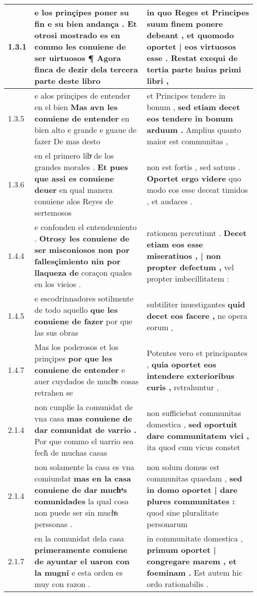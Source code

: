 \begin{tabular}{|p{1cm}|p{6.5cm}|p{6.5cm}|}
1.3.1 & e los prinçipes poner su fin e su bien andança . \textbf{ Et otrosi mostrado es en commo les conuiene de ser uirtuosos } ¶ Agora finca de dezir dela tercera parte deste libro & in quo Reges et Principes suum finem ponere debeant , \textbf{ et quomodo oportet | eos virtuosos esse . } Restat exequi de tertia parte huius primi libri , \\\hline
1.3.5 & e alos prinçipes de entender en el bien \textbf{ Mas avn les conuiene de entender } en bien alto e grande e guaue de fazer De mas desto & et Principes tendere in bonum , \textbf{ sed etiam decet eos tendere in bonum arduum . } Amplius quanto maior est communitas , \\\hline
1.3.6 & en el primero libͤ de los grandes morales . \textbf{ Et pues que assi es conuiene deuer } en qual manera conuiene alos Reyes de sertemosos & non est fortis , sed satuus . \textbf{ Oportet ergo videre } quo modo eos esse deceat timidos , et audaces . \\\hline
1.4.4 & e confonden el entendemiento . \textbf{ Otrosy les conuiene de ser misconiosos non por fallesçimiento nin por llaqueza de } coraçon quales en los vieios . & rationem percutiunt . \textbf{ Decet etiam eos esse miseratiuos , | non propter defectum , } vel propter imbecillitatem : \\\hline
1.4.5 & e escodrinnadores sotilmente de todo aquello \textbf{ que les conuiene de fazer } por que las sus obras & subtiliter inuestigantes \textbf{ quid decet eos facere , } ne opera eorum , \\\hline
1.4.7 & Mas los poderosos et los prinçipes \textbf{ por que les conuiene de entender } e auer cuydados de muchͣs cosas retrahen se & Potentes vero et principantes , \textbf{ quia oportet eos intendere exterioribus curis , } retrahuntur , \\\hline
2.1.4 & non cunplie la comunidat de vna casa \textbf{ mas conuiene de dar comunidat de varrio . } Por que commo el uarrio sea fech̃ de muchas casas & non sufficiebat communitas domestica , \textbf{ sed oportuit dare communitatem vici , } ita quod cum vicus constet \\\hline
2.1.4 & non solamente la casa es vna comiundat \textbf{ mas en la casa conuiene de dar muchͣs comunidades } la qual cosa non puede ser sin muchͣs perssonas . & non solum domus est communitas quaedam , \textbf{ sed in domo oportet | dare plures communitates : } quod sine pluralitate personarum \\\hline
2.1.7 & en la comunidat dela casa \textbf{ primeramente conuiene de ayuntar el uaron con la mugni } e esta orden es muy con razon . & in communitate domestica , \textbf{ primum oportet | congregare marem , et foeminam . } Est autem hic ordo rationabilis . \\\hline

\end{tabular}
